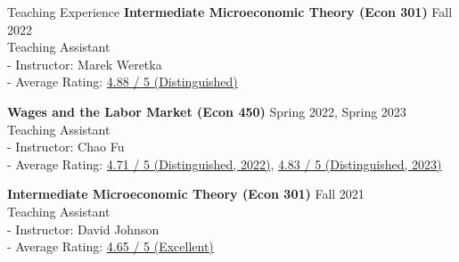 \documentclass{resume} %
\begin{document}
\begin{rSection}{Teaching Experience}
{\bf Intermediate Microeconomic Theory (Econ 301)} \hfill {Fall 2022} 
\\{Teaching Assistant}
\\- Instructor: Marek Weretka
\\- Average Rating: \href{https://www.jasmiths.com/pdfs/evaluation_econ301_22_fall.pdf}{4.88 / 5 (Distinguished)}

{\bf Wages and the Labor Market (Econ 450)} \hfill {Spring 2022, Spring 2023} 
\\{Teaching Assistant}
\\- Instructor: Chao Fu
\\- Average Rating: \href{https://www.jasmiths.com/pdfs/evaluation_econ450_22_spring.pdf}{4.71 / 5 (Distinguished, 2022)}, \href{https://www.jasmiths.com/pdfs/evaluation_econ450_23_spring.pdf}{4.83 / 5 (Distinguished, 2023)}

{\bf Intermediate Microeconomic Theory (Econ 301)} \hfill {Fall 2021} 
\\{Teaching Assistant}
\\- Instructor: David Johnson
\\- Average Rating: \href{https://www.jasmiths.com/pdfs/evaluation_econ301_21_fall.pdf}{4.65 / 5 (Excellent)}
\end{rSection}
\end{document}
